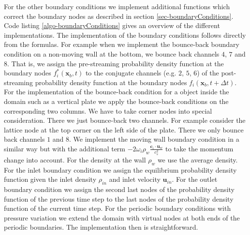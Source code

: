 \documentclass[a4paper,11pt, footsepline]{book}
\begin{document}
For the other boundary conditions we implement additional functions which correct the boundary nodes as described in section \ref{sec-boundaryConditions}. Code listing \ref{algo-boundaryConditions} gives an overview of the different implementations.
The implementation of the boundary conditions follows directly from the formulas. For example when we implement the bounce-back boundary condition on a non-moving wall at the bottom, we bounce back channels $4$, $7$ and $8$. That is, we assign the pre-streaming probability density function at the boundary nodes $f_{i}^{\ast}(\mathbf{x}_{b},t)$ to the conjugate channels (e.g. $2$, $5$, $6$) of the post-streaming probability density function at the boundary nodes $f_{i}(\mathbf{x}_{b},t+\Delta t)$. 
For the implementation of the bounce-back condition for a object inside the domain such as a vertical plate we apply the bounce-back conditions on the corresponding two columns. We have to take corner nodes into special consideration. There we just bounce-back two channels. For example consider the lattice node at the top corner on the left side of the plate. There we only bounce back channels $1$ and $8$.
We implement the moving wall boundary condition in a similar way but with the additional term $-2\omega_{i}\rho_{w}\frac{\mathbf{c}_{i}\cdot \mathbf{u}_{w}}{c_{s}^{2}}$ to take the momentum change into account. For the density at the wall $\rho_{w}$ we use the average density.
For the inlet boundary condition we assign the equilibrium probability density function given the inlet density $\rho_{in}$ and inlet velocity $\mathbf{u}_{in}$. 
For the outlet boundary condition we assign the second last nodes of the probability density function of the previous time step to the last nodes of the probability density function of the current time step.
For the periodic boundary conditions with pressure variation we extend the domain with virtual nodes at both ends of the periodic boundaries. The implementation then is straightforward. 
\end{document}

